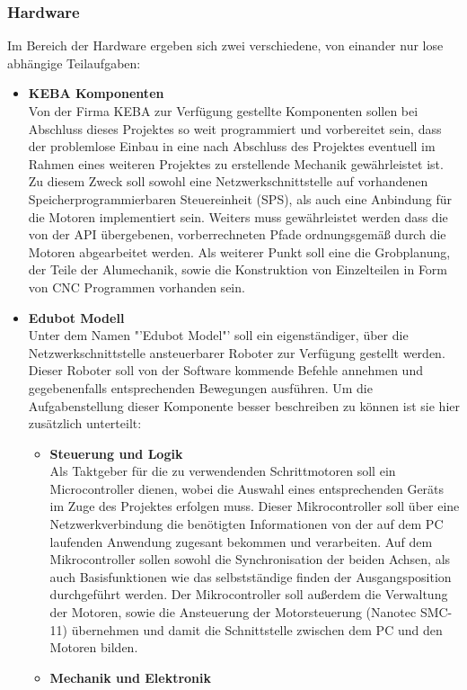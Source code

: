\subsubsection{Hardware}
Im Bereich der Hardware ergeben sich zwei verschiedene, von einander nur lose abhängige Teilaufgaben:
\begin{itemize}
\item \textbf{KEBA Komponenten}\\
Von der Firma KEBA zur Verfügung gestellte Komponenten sollen bei Abschluss dieses Projektes so weit programmiert und vorbereitet sein, dass der problemlose Einbau in eine nach Abschluss des Projektes eventuell im Rahmen eines weiteren Projektes zu erstellende Mechanik gewährleistet ist. Zu diesem Zweck soll sowohl eine Netzwerkschnittstelle auf vorhandenen Speicherprogrammierbaren Steuereinheit (SPS), als auch eine Anbindung für die Motoren implementiert sein. Weiters muss gewährleistet werden dass die von der API übergebenen, vorberrechneten Pfade ordnungsgemäß durch die Motoren abgearbeitet werden.
Als weiterer Punkt soll eine die Grobplanung, der Teile der Alumechanik, sowie die Konstruktion von Einzelteilen in Form von CNC Programmen vorhanden sein.
\item \textbf{Edubot Modell}\\
Unter dem Namen "'Edubot Model"' soll ein eigenständiger, über die Netzwerkschnittstelle ansteuerbarer Roboter zur Verfügung gestellt werden. Dieser Roboter soll von der Software kommende Befehle annehmen und gegebenenfalls entsprechenden Bewegungen ausführen. Um die Aufgabenstellung dieser Komponente besser beschreiben zu können ist sie hier zusätzlich unterteilt:
\begin{itemize}
\item \textbf{Steuerung und Logik}\\
Als Taktgeber für die zu verwendenden Schrittmotoren soll ein Microcontroller dienen, wobei die Auswahl eines entsprechenden Geräts im Zuge des Projektes erfolgen muss. Dieser Mikrocontroller soll über eine Netzwerkverbindung die benötigten Informationen von der auf dem PC laufenden Anwendung zugesant bekommen und verarbeiten.
Auf dem Mikrocontroller sollen sowohl die Synchronisation der beiden Achsen, als auch Basisfunktionen wie das selbstständige finden der Ausgangsposition durchgeführt werden. Der Mikrocontroller soll außerdem die Verwaltung der Motoren, sowie die Ansteuerung der Motorsteuerung (Nanotec SMC-11) übernehmen und damit die Schnittstelle zwischen dem PC und den Motoren bilden.
\item \textbf{Mechanik und Elektronik}\\

\end{itemize}
\end{itemize}
